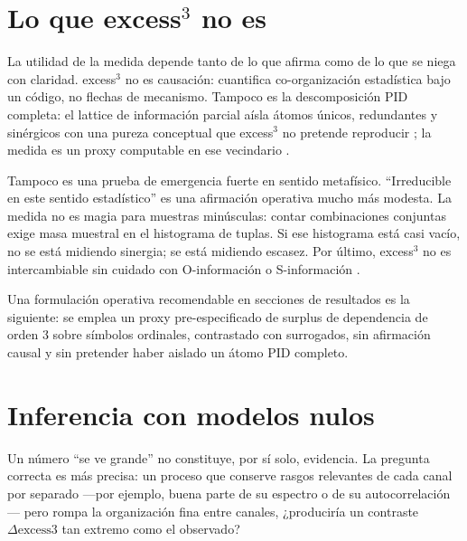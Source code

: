 \documentclass[11pt,a4paper]{article}
\begin{document}
\section{Lo que excess$^3$ no es}
\label{sec:noes}

La utilidad de la medida depende tanto de lo que afirma como de lo que se
niega con claridad. excess$^3$ no es causaci\'on: cuantifica
co-organizaci\'on estad\'istica bajo un c\'odigo, no flechas de mecanismo.
Tampoco es la descomposici\'on PID completa: el lattice de informaci\'on
parcial aísla \'atomos \'unicos, redundantes y sin\'ergicos con una pureza
conceptual que excess$^3$ no pretende reproducir
\citep{Williams2010,Bertschinger2014}; la medida es un proxy computable en
ese vecindario \citep{Padilla2026excess3}.

Tampoco es una prueba de emergencia fuerte en sentido metaf\'isico.
``Irreducible en este sentido estad\'istico'' es una afirmaci\'on operativa
mucho m\'as modesta. La medida no es magia para muestras min\'usculas: contar
combinaciones conjuntas exige masa muestral en el histograma de tuplas. Si
ese histograma est\'a casi vac\'io, no se est\'a midiendo sinergia; se est\'a
midiendo escasez. Por \'ultimo, excess$^3$ no es intercambiable sin cuidado
con O-informaci\'on o S-informaci\'on \citep{Rosas2019}.

Una formulaci\'on operativa recomendable en secciones de resultados es la
siguiente: se emplea un proxy pre-especificado de surplus de dependencia de
orden 3 sobre s\'imbolos ordinales, contrastado con surrogados, sin
afirmaci\'on causal y sin pretender haber aislado un \'atomo PID completo.

\section{Inferencia con modelos nulos}
\label{sec:nulos}

Un n\'umero ``se ve grande'' no constituye, por s\'i solo, evidencia. La
pregunta correcta es m\'as precisa: un proceso que conserve rasgos
relevantes de cada canal por separado ---por ejemplo, buena parte de su
espectro o de su autocorrelaci\'on--- pero rompa la organizaci\'on fina entre
canales, ¿producir\'ia un contraste $\Delta\mathrm{excess3}$ tan extremo como
el observado?
\end{document}
